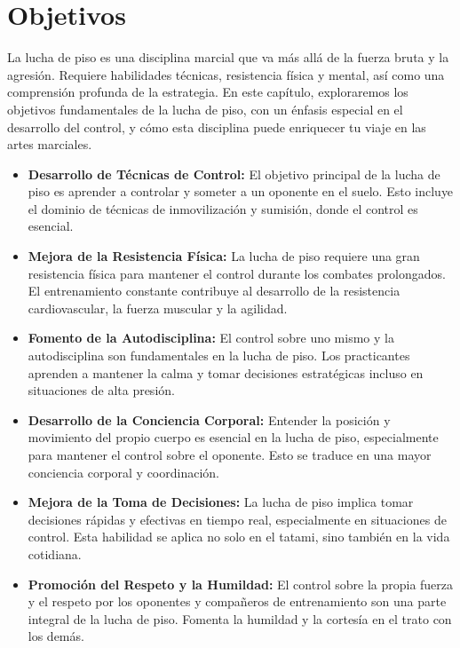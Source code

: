 \section{Objetivos}

La lucha de piso es una disciplina marcial que va más allá de la fuerza bruta y la agresión. Requiere habilidades técnicas, resistencia física y mental, así como una comprensión profunda de la estrategia. En este capítulo, exploraremos los objetivos fundamentales de la lucha de piso, con un énfasis especial en el desarrollo del control, y cómo esta disciplina puede enriquecer tu viaje en las artes marciales.

\begin{itemize}
	\item \textbf{Desarrollo de Técnicas de Control:} El objetivo principal de la lucha de piso es aprender a controlar y someter a un oponente en el suelo. Esto incluye el dominio de técnicas de inmovilización y sumisión, donde el control es esencial.

	\item \textbf{Mejora de la Resistencia Física:} La lucha de piso requiere una gran resistencia física para mantener el control durante los combates prolongados. El entrenamiento constante contribuye al desarrollo de la resistencia cardiovascular, la fuerza muscular y la agilidad.

	\item \textbf{Fomento de la Autodisciplina:} El control sobre uno mismo y la autodisciplina son fundamentales en la lucha de piso. Los practicantes aprenden a mantener la calma y tomar decisiones estratégicas incluso en situaciones de alta presión.

	\item \textbf{Desarrollo de la Conciencia Corporal:} Entender la posición y movimiento del propio cuerpo es esencial en la lucha de piso, especialmente para mantener el control sobre el oponente. Esto se traduce en una mayor conciencia corporal y coordinación.

	\item \textbf{Mejora de la Toma de Decisiones:} La lucha de piso implica tomar decisiones rápidas y efectivas en tiempo real, especialmente en situaciones de control. Esta habilidad se aplica no solo en el tatami, sino también en la vida cotidiana.

	\item \textbf{Promoción del Respeto y la Humildad:} El control sobre la propia fuerza y el respeto por los oponentes y compañeros de entrenamiento son una parte integral de la lucha de piso. Fomenta la humildad y la cortesía en el trato con los demás.


\end{itemize}
